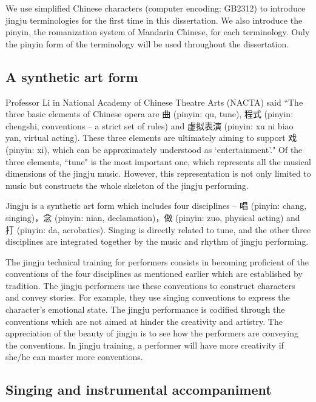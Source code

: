 We use simplified Chinese characters (computer encoding: GB2312) to introduce jingju terminologies for the first time in this dissertation. We also introduce the pinyin, the romanization system of Mandarin Chinese, for each terminology. Only the pinyin form of the terminology will be used throughout the dissertation. 

\subsection{A synthetic art form}

Professor Li in National Academy of Chinese Theatre Arts (NACTA) said ``The three basic elements of Chinese opera are 曲 (pinyin: qu, tune), 程式 (pinyin: chengshi, conventions -- a strict set of rules) and 虚拟表演 (pinyin: xu ni biao yan, virtual acting). These three elements are ultimately aiming to support 戏 (pinyin: xi), which can be approximately understood as `entertainment'." Of the three elements, ``tune" is the most important one, which represents all the musical dimensions of the jingju music. However, this representation is not only limited to music but constructs the whole skeleton of the jingju performing.

Jingju is a synthetic art form which includes four disciplines -- 唱 (pinyin: chang, singing)，念 (pinyin: nian, declamation)，做 (pinyin: zuo, physical acting) and 打 (pinyin: da, acrobatics). Singing is directly related to tune, and the other three disciplines are integrated together by the music and rhythm of jingju performing. 

The jingju technical training for performers consists in becoming proficient of the conventions of the four disciplines as mentioned earlier which are established by tradition. The jingju performers use these conventions to construct characters and convey stories. For example, they use singing conventions to express the character's emotional state. The jingju performance is codified through the conventions which are not aimed at hinder the creativity and artistry. The appreciation of the beauty of jingju is to see how the performers are conveying the conventions. In jingju training, a performer will have more creativity if she/he can master more conventions.

\subsection{Singing and instrumental accompaniment}

